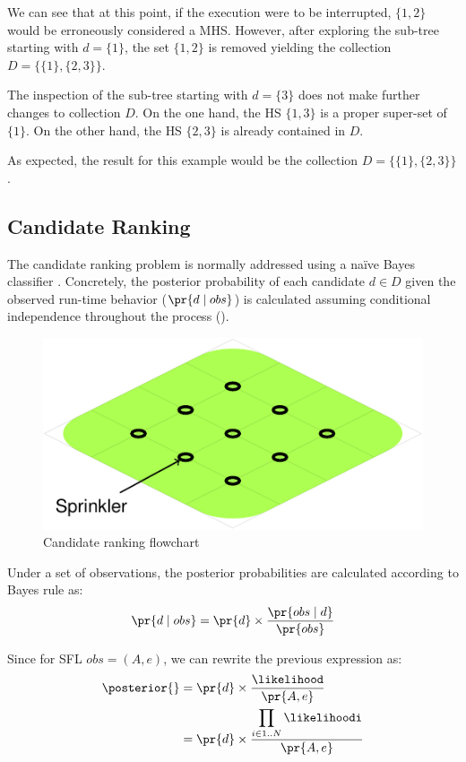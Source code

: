 We can see that at this point, if the execution were to be
interrupted, $\{1,2\}$ would be erroneously considered a \ac{MHS}.
%
However, after exploring the sub-tree starting with $d = \{1\}$,
the set $\{1,2\}$
is removed yielding the collection $D=\{\{1\},\{2,3\}\}$.

The inspection of the sub-tree starting with $d = \{3\}$
does not make further changes to collection $D$.
%
On the one hand, the \ac{HS} $\{1,3\}$ is a proper super-set of
$\{1\}$.
%
On the other hand, the \ac{HS} $\{2,3\}$ is already contained in
$D$.
%

As expected, the result for this example would be the collection
$D=\{\{1\},\{2,3\}\}$.
%
\FloatBarrier
\subsection{Candidate Ranking}
\label{sec:intro:candidate-ranking}
The candidate ranking problem is normally addressed using a na\"{i}ve
Bayes classifier \citep{Abreu09a,Kleer09}.
%
Concretely, the posterior probability of each candidate $d \in D$
given the observed run-time behavior ($\pr{d \mid obs}$) is calculated
assuming conditional independence throughout the process
().

\begin{figure}[!ht]
  \includegraphics[scale=0.9,page=15]{figures/introduction/figures/main.pdf}
  \caption{Candidate ranking flowchart\label{fig:intro:cr-flowchart}}
\end{figure}


Under a set of observations, the posterior probabilities are
calculated according to Bayes rule as:
%
\begin{equation}
  \pr{d\mid obs} = \pr{d} \times \frac{\pr{obs\mid d}}{\pr{obs}}
\end{equation}

Since for \ac{SFL} $obs = (A,e)$, we can rewrite the previous
expression as:
\begin{equation}
  \begin{split}
    \posterior{}   & =  \pr{d} \times \frac{\displaystyle \likelihood}{\pr{A, e}} \\
    & =  \pr{d} \times\frac{\displaystyle \prod_{i \in 1..N} \likelihoodi}{\pr{A, e}}
  \end{split}
\end{equation}


